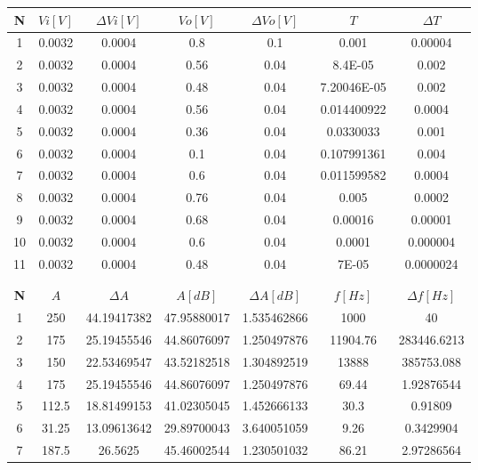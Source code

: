 \begin{table}[h!]
\centering
\begin{tabular}{|c|c|c|c|c|c|c|}
\hline
\textbf{N} & \textbf{\(Vi[V]\)} & \textbf{\(\varDelta Vi[V]\)} & \textbf{\(Vo[V]\)} & \textbf{\(\varDelta Vo[V]\)} & \textbf{\(T\)} & \textbf{\(\varDelta T\)} \\ \hline
1 & 0.0032 & 0.0004 & 0.8 & 0.1 & 0.001 & 0.00004 \\ \hline
2 & 0.0032 & 0.0004 & 0.56 & 0.04 & 8.4E-05 & 0.002 \\ \hline
3 & 0.0032 & 0.0004 & 0.48 & 0.04 & 7.20046E-05 & 0.002 \\ \hline
4 & 0.0032 & 0.0004 & 0.56 & 0.04 & 0.014400922 & 0.0004 \\ \hline
5 & 0.0032 & 0.0004 & 0.36 & 0.04 & 0.0330033 & 0.001 \\ \hline
6 & 0.0032 & 0.0004 & 0.1 & 0.04 & 0.107991361 & 0.004 \\ \hline
7 & 0.0032 & 0.0004 & 0.6 & 0.04 & 0.011599582 & 0.0004 \\ \hline
8 & 0.0032 & 0.0004 & 0.76 & 0.04 & 0.005 & 0.0002 \\ \hline
9 & 0.0032 & 0.0004 & 0.68 & 0.04 & 0.00016 & 0.00001 \\ \hline
10 & 0.0032 & 0.0004 & 0.6 & 0.04 & 0.0001 & 0.000004 \\ \hline
11 & 0.0032 & 0.0004 & 0.48 & 0.04 & 7E-05 & 0.0000024 \\ \hline
\\ 
\\ \hline
\textbf{N} & \textbf{\(A\)} & \textbf{\(\varDelta A\)} & \textbf{\(A[dB]\)} & \textbf{\(\varDelta A[dB]\)} & \textbf{\(f[Hz]\)} & \textbf{\(\varDelta f[Hz]\)} \\ \hline
1 & 250 & 44.19417382 & 47.95880017 & 1.535462866 & 1000 & 40 \\ \hline
2 & 175 & 25.19455546 & 44.86076097 & 1.250497876 & 11904.76 & 283446.6213 \\ \hline
3 & 150 & 22.53469547 & 43.52182518 & 1.304892519 & 13888 & 385753.088 \\ \hline
4 & 175 & 25.19455546 & 44.86076097 & 1.250497876 & 69.44 & 1.92876544 \\ \hline
5 & 112.5 & 18.81499153 & 41.02305045 & 1.452666133 & 30.3 & 0.91809 \\ \hline
6 & 31.25 & 13.09613642 & 29.89700043 & 3.640051059 & 9.26 & 0.3429904 \\ \hline
7 & 187.5 & 26.5625 & 45.46002544 & 1.230501032 & 86.21 & 2.97286564 \\ \hline

\end{tabular}
\end{table}
